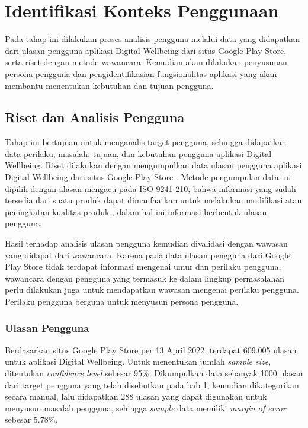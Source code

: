 \section{Identifikasi Konteks Penggunaan}
\label{sec:identifikasi_konteks_penggunaan}

Pada tahap ini dilakukan proses analisis pengguna melalui data yang didapatkan dari ulasan pengguna aplikasi Digital Wellbeing dari situs Google Play Store, serta riset dengan metode wawancara. Kemudian akan dilakukan penyusunan persona pengguna dan pengidentifikasian fungsionalitas aplikasi yang akan membantu menentukan kebutuhan dan tujuan pengguna.

\subsection{Riset dan Analisis Pengguna}
\label{subsec:riset_analisis}

Tahap ini bertujuan untuk menganalis target pengguna, sehingga didapatkan data perilaku, masalah, tujuan, dan kebutuhan pengguna aplikasi Digital Wellbeing. Riset dilakukan dengan mengumpulkan data ulasan pengguna aplikasi Digital Wellbeing dari situs Google Play Store \textcite{dwplaystorereviews}. Metode pengumpulan data ini dipilih dengan alasan mengacu pada ISO 9241-210, bahwa informasi yang sudah tersedia dari suatu produk dapat dimanfaatkan untuk melakukan modifikasi atau peningkatan kualitas produk \parencite{iso9241-210:2010}, dalam hal ini informasi berbentuk ulasan pengguna.

Hasil terhadap analisis ulasan pengguna kemudian divalidasi dengan wawasan yang didapat dari wawancara. Karena pada data ulasan pengguna dari Google Play Store tidak terdapat informasi mengenai umur dan perilaku pengguna, wawancara dengan pengguna yang termasuk ke dalam lingkup permasalahan perlu dilakukan juga untuk mendapatkan wawasan mengenai perilaku pengguna. Perilaku pengguna berguna untuk menyusun persona pengguna.

\subsubsection{Ulasan Pengguna}
\label{subsubsec:ulasan_pengguna}

Berdasarkan situs Google Play Store per 13 April 2022, terdapat 609.005 ulasan untuk aplikasi Digital Wellbeing. Untuk menentukan jumlah \textit{sample size}, ditentukan \textit{confidence level} sebesar 95\%. Dikumpulkan data sebanyak 1000 ulasan dari target pengguna yang telah disebutkan pada bab \ref{sec:identifikasi_konteks_penggunaan},  kemudian dikategorikan secara manual, lalu didapatkan 288 ulasan yang dapat digunakan untuk menyusun masalah pengguna, sehingga \textit{sample} data memiliki \textit{margin of error} sebesar 5.78\%.

